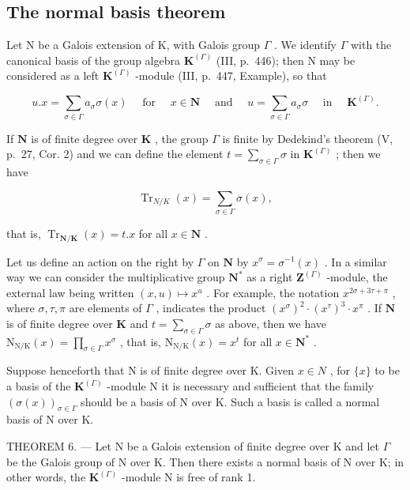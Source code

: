 \subsection{The normal basis theorem}

Let N be a Galois extension of K, with Galois group \(\Gamma\) . We identify \(\Gamma\) with the canonical basis of the group algebra \(\mathbf{K}^{(\Gamma)}\) (III, p.~446); then N may be considered as a left \(\mathbf{K}^{(\Gamma)}\) -module (III, p.~447, Example), so that

\[
u. x = \sum_ {\sigma \in \Gamma} a _ {\sigma} \sigma (x) \quad \text { for } \quad x \in \mathbf {N} \quad \text { and } \quad u = \sum_ {\sigma \in \Gamma} a _ {\sigma} \sigma \quad \text { in } \quad \mathbf {K} ^ {(\Gamma)}.
\]

If \(\mathbf{N}\) is of finite degree over \(\mathbf{K}\) , the group \(\Gamma\) is finite by Dedekind's theorem (V, p.~27, Cor. 2) and we can define the element \(t = \sum_{\sigma \in \Gamma} \sigma\) in \(\mathbf{K}^{(\Gamma)}\) ; then we have

\[
\operatorname{Tr} _ {N / K} (x) = \sum_ {\sigma \in \Gamma} \sigma (x),
\]

that is, \(\operatorname{Tr}_{\mathbf{N} / \mathbf{K}}(x) = t.x\) for all \(x \in \mathbf{N}\) .

Let us define an action on the right by \(\Gamma\) on \(\mathbf{N}\) by \(x^{\sigma} = \sigma^{-1}(x)\) . In a similar way we can consider the multiplicative group \(\mathbf{N}^{*}\) as a right \(\mathbf{Z}^{(\Gamma)}\) -module, the external law being written \((x, u) \mapsto x^u\) . For example, the notation \(x^{2\sigma + 3\tau + \pi}\) , where \(\sigma, \tau, \pi\) are elements of \(\Gamma\) , indicates the product \((x^\sigma)^2 \cdot (x^\tau)^3 \cdot x^\pi\) . If \(\mathbf{N}\) is of finite degree over \(\mathbf{K}\) and \(t = \sum_{\sigma \in \Gamma} \sigma\) as above, then we have \(\mathrm{N}_{\mathrm{N/K}}(x) = \prod_{\sigma \in \Gamma} x^\sigma\) , that is, \(\mathrm{N}_{\mathrm{N/K}}(x) = x^t\) for all \(x \in \mathbf{N}^*\) .

Suppose henceforth that N is of finite degree over K. Given \(x \in N\) , for \(\{x\}\) to be a basis of the \(\mathbf{K}^{(\Gamma)}\) -module N it is necessary and sufficient that the family \((\sigma(x))_{\sigma \in \Gamma}\) should be a basis of N over K. Such a basis is called a normal basis of N over K.

THEOREM 6. --- Let N be a Galois extension of finite degree over K and let \(\Gamma\) be the Galois group of N over K. Then there exists a normal basis of N over K; in other words, the \(\mathbf{K}^{(\Gamma)}\) -module N is free of rank 1.

